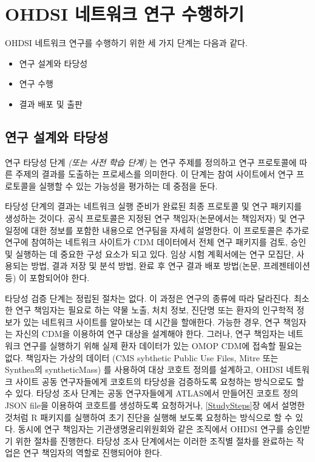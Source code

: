 \documentclass[11pt]{book}
\providecommand{\tightlist}{%
  \setlength{\itemsep}{0pt}\setlength{\parskip}{0pt}}
\theoremstyle{definition}
\theoremstyle{definition}
\theoremstyle{definition}
\theoremstyle{remark}
\begin{document}
\section{OHDSI 네트워크 연구 수행하기}\label{ohdsi---}


OHDSI 네트워크 연구를 수행하기 위한 세 가지 단계는 다음과 같다.

\begin{itemize}
\tightlist
\item
  연구 설계와 타당성
\item
  연구 수행
\item
  결과 배포 및 출판
\end{itemize}

\subsection{연구 설계와 타당성}\label{--}

연구 타당성 단계 \emph{(또는 사전 학습 단계)} 는 연구 주제를 정의하고
연구 프로토콜에 따른 주제의 결과를 도출하는 프로세스를 의미한다. 이
단계는 참여 사이트에서 연구 프로토콜을 실행할 수 있는 가능성을 평가하는
데 중점을 둔다.

타당성 단계의 결과는 네트워크 실행 준비가 완료된 최종 프로토콜 및 연구
패키지를 생성하는 것이다. 공식 프로토콜은 지정된 연구 책임자(논문에서는
책임저자) 및 연구 일정에 대한 정보를 포함한 내용으로 연구팀을 자세히
설명한다. 이 프로토콜은 추가로 연구에 참여하는 네트워크 사이트가 CDM
데이터에서 전체 연구 패키지를 검토, 승인 및 실행하는 데 중요한 구성
요소가 되고 있다. 임상 시험 계획서에는 연구 모집단, 사용되는 방법, 결과
저장 및 분석 방법, 완료 후 연구 결과 배포 방법(논문, 프레젠테이션 등) 이
포함되어야 한다.

타당성 검증 단계는 정립된 절차는 없다. 이 과정은 연구의 종류에 따라
달라진다. 최소한 연구 책임자는 필요로 하는 약물 노출, 처치 정보, 진단명
또는 환자의 인구학적 정보가 있는 네트워크 사이트를 알아보는 데 시간을
할애한다. 가능한 경우, 연구 책임자는 자신의 CDM을 이용하여 연구 대상을
설계해야 한다. 그러나, 연구 책임자는 네트워크 연구를 실행하기 위해 실제
환자 데이터가 있는 OMOP CDM에 접속할 필요는 없다. 책임자는 가상의 데이터
(CMS sybthetic Public Use Files, Mitre 또는 Synthea의 syntheticMass) 를
사용하여 대상 코호트 정의를 설계하고, OHDSI 네트워크 사이트 공동
연구자들에게 코호트의 타당성을 검증하도록 요청하는 방식으로도 할 수
있다. 타당성 조사 단계는 공동 연구자들에게 ATLAS에서 만들어진 코호트
정의 JSON file을 이용하여 코호트를 생성하도록 요청하거나,
\ref{StudySteps}장 에서 설명한 것처럼 R 패키지를 실행하여 초기 진단을
실행해 보도록 요청하는 방식으로 할 수 있다. 동시에 연구 책임자는
기관생명윤리위원회와 같은 조직에서 OHDSI 연구를 승인받기 위한 절차를
진행한다. 타당성 조사 단계에서는 이러한 조직별 절차를 완료하는 작업은
연구 책임자의 역할로 진행되어야 한다.
\end{document}
